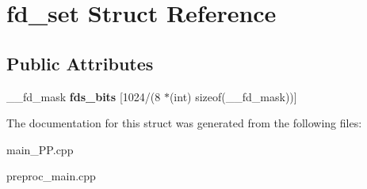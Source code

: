 \hypertarget{structfd__set}{\section{fd\+\_\+set Struct Reference}
\label{structfd__set}
}
\subsection*{Public Attributes}
\begin{DoxyCompactItemize}
\item 
\hypertarget{structfd__set_a7d508108ca3c57fef0bcc8ee5dae9957}{\+\_\+\+\_\+fd\+\_\+mask {\bfseries fds\+\_\+bits} \mbox{[}1024/(8 $\ast$(int) sizeof(\+\_\+\+\_\+fd\+\_\+mask))\mbox{]}}\label{structfd__set_a7d508108ca3c57fef0bcc8ee5dae9957}

\end{DoxyCompactItemize}


The documentation for this struct was generated from the following files\+:\begin{DoxyCompactItemize}
\item 
main\+\_\+\+P\+P.\+cpp\item 
preproc\+\_\+main.\+cpp\end{DoxyCompactItemize}
